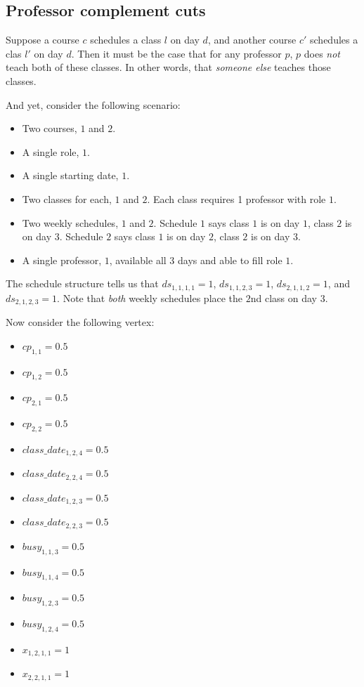 \subsection{Professor complement cuts}

Suppose a course $c$ schedules a class $l$ on day $d$, and another course $c'$ schedules a clas $l'$ on day $d$. Then it must be the case that for any professor $p$, $p$ does \emph{not} teach both of these classes. In other words, that \emph{someone else} teaches those classes.

And yet, consider the following scenario:

\begin{itemize}
\item Two courses, $1$ and $2$.
\item A single role, $1$.
\item A single starting date, $1$.
\item Two classes for each, $1$ and $2$. Each class requires 1 professor with role $1$.
\item Two weekly schedules, $1$ and $2$. Schedule $1$ says class $1$ is on day $1$, class $2$ is on day $3$. Schedule $2$ says class $1$ is on day $2$, class $2$ is on day $3$.
\item A single professor, $1$, available all $3$ days and able to fill role $1$.
\end{itemize}

The schedule structure tells us that $ds_{1, 1, 1, 1} = 1$, $ds_{1, 1, 2, 3} = 1$, $ds_{2, 1, 1, 2} = 1$, and $ds_{2, 1, 2, 3} = 1$. Note that \emph{both} weekly schedules place the $2$nd class on day $3$.

Now consider the following vertex:

\begin{itemize}
\item $cp_{1, 1} = 0.5$
\item $cp_{1, 2} = 0.5$
\item $cp_{2, 1} = 0.5$
\item $cp_{2, 2} = 0.5$
\item $class\_date_{1, 2, 4} = 0.5$
\item $class\_date_{2, 2, 4} = 0.5$
\item $class\_date_{1, 2, 3} = 0.5$
\item $class\_date_{2, 2, 3} = 0.5$
\item $busy_{1, 1, 3} = 0.5$
\item $busy_{1, 1, 4} = 0.5$
\item $busy_{1, 2, 3} = 0.5$
\item $busy_{1, 2, 4} = 0.5$
\item $x_{1, 2, 1, 1} = 1$
\item $x_{2, 2, 1, 1} = 1$
\end{itemize}

